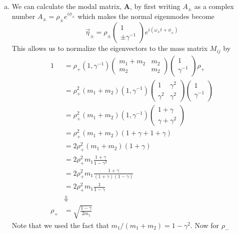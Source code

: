 \documentclass[11pt]{article}
\numberwithin{equation}{section}
\begin{document}
\begin{enumerate}[(a)]
\item We can calculate the modal matrix, $\mathbf{A}$, by first writing $A_{\pm}$ as a 
complex number $A_{\pm} = \rho_{\pm}e^{i\phi_{\pm}}$ which makes the normal eigenmodes become
$$\vec{\eta}_{\pm} = \rho_{\pm}\left(\begin{array}{c} 1\\ \pm\gamma^{-1}\end{array}\right)e^{i(\omega_{\pm}t+\phi_{\pm})}$$
This allows us to normalize the eigenvectors to the mass matrix $M_{ij}$ by
\begin{align*}
1 &= \rho_+(1,\gamma^{-1})\left(\begin{array}{cc}
                m_1+m_2          &m_2\\
                m_2              &m_2
           \end{array}\right)\left(\begin{array}{c}1\\ \gamma^{-1}\end{array}\right)\rho_+\\
&= \rho_+^2(m_1+m_2)(1,\gamma^{-1})\left(\begin{array}{cc}
                1             &\gamma^2\\
                \gamma^2      &\gamma^2
           \end{array}\right)\left(\begin{array}{c}1\\ \gamma^{-1}\end{array}\right)\\
&= \rho_+^2(m_1+m_2)(1,\gamma^{-1})\left(\begin{array}{c}
                1+\gamma\\
                \gamma+\gamma^2 
           \end{array}\right)\\
&= \rho_+^2(m_1+m_2)(1+\gamma+1+\gamma)\\
&= 2\rho_+^2(m_1+m_2)(1+\gamma)\\
&= 2\rho_+^2m_1\frac{1+\gamma}{1-\gamma^2}\\
&= 2\rho_+^2m_1\frac{1+\gamma}{(1+\gamma)(1-\gamma)}\\
&= 2\rho_+^2m_1\frac{1}{1-\gamma}\\
&\Downarrow\\
\rho_+ &= \sqrt{\frac{1-\gamma}{2m_1}}
\end{align*}
Note that we used the fact that $m_1/(m_1+m_2) = 1-\gamma^2$. Now for $\rho_-$
\begin{align*}

\end{align*}
\end{enumerate}
\end{document}
